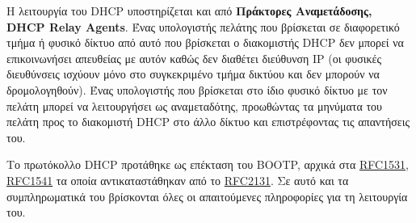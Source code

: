 Η λειτουργία του DHCP υποστηρίζεται και από \textbf{Πράκτορες Αναμετάδοσης, DHCP Relay Agents}.  Ένας υπολογιστής πελάτης που βρίσκεται σε διαφορετικό τμήμα ή φυσικό δίκτυο από αυτό που βρίσκεται ο διακομιστής DHCP δεν μπορεί να επικοινωνήσει απευθείας με αυτόν καθώς δεν διαθέτει διεύθυνση IP (οι φυσικές διευθύνσεις ισχύουν μόνο στο συγκεκριμένο τμήμα δικτύου και δεν μπορούν να δρομολογηθούν). Ένας υπολογιστής που βρίσκεται στο ίδιο φυσικό δίκτυο με τον πελάτη μπορεί να λειτουργήσει ως αναμεταδότης, προωθώντας τα μηνύματα του πελάτη προς το διακομιστή DHCP στο άλλο δίκτυο και επιστρέφοντας τις απαντήσεις του.

Το πρωτόκολλο DHCP προτάθηκε ως επέκταση του BOOTP, αρχικά στα \href{https://www.ietf.org/rfc/rfc1531.txt}{RFC1531}, \href{https://www.ietf.org/rfc/rfc1541.txt}{RFC1541} τα οποία αντικαταστάθηκαν από το \href{https://www.ietf.org/rfc/rfc2131.txt}{RFC2131}. Σε αυτό και τα συμπληρωματικά του βρίσκονται όλες οι απαιτούμενες πληροφορίες για τη λειτουργία του.



